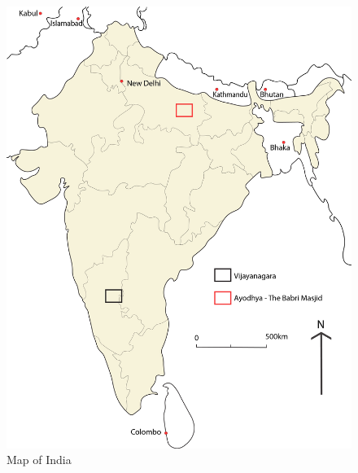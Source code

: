 \begin{figure}[!htb]
\includegraphics[width=\linewidth]{figures/Northman_fig1}
\caption{Map of India}
\label{fig:Northman_fig1}
\end{figure}
	 
